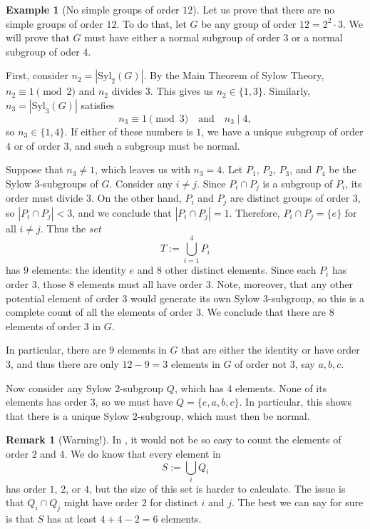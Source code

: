 \documentclass[12pt]{report}
\numberwithin{equation}{section}
\numberwithin{theorem}{chapter}
\theoremstyle{definition}
\newtheorem{example}[theorem]{Example}
\newtheorem*{basic properties}{Basic Properties}
\newtheorem*{Important Remark}{Important Remark}
\newtheorem{remark}[theorem]{Remark}
\begin{document}
\begin{example}[No simple groups of order $12$]\label{example sylow 12}
Let us prove that there are no simple groups of order $12$. To do that, let $G$ be any group of order $12 = 2^2 \cdot 3$. We will prove that $G$ must have either a normal subgroup of order $3$ or a normal subgroup of oder $4$.


First, consider $n_2=|\mathrm{Syl}_2(G)|$. By the Main Theorem of Sylow Theory, $n_2 \equiv 1 \!\pmod 2$ and $n_2$ divides $3$. This gives us $n_2 \in \{ 1, 3 \}$. Similarly, $n_3 = |\mathrm{Syl}_3(G)|$ satisfies
$$n_3 \equiv 1 \!\!\pmod 3 \quad \textrm{and} \quad n_3 \mid 4,$$
so $n_3 \in \{1, 4 \}$.
If either of these numbers is $1$, we have a unique subgroup of order $4$ or of order $3$, and such a subgroup must be normal. 

Suppose that $n_3 \neq 1$, which leaves us with $n_3 = 4$. Let $P_1$, $P_2$, $P_3$, and $P_4$ be the Sylow $3$-subgroups of $G$. Consider any $i \neq j$. Since $P_i \cap P_j$ is a subgroup of $P_i$, its order must divide $3$. On the other hand, $P_i$ and $P_j$ are distinct groups of order $3$, so $|P_i \cap P_j| < 3$, and we conclude that  $|P_i \cap P_j| = 1$. Therefore, $P_i \cap P_j = \{e\}$ for all $i \neq j$. Thus the {\em set} 
$$T := \bigcup_{i=1}^4 P_i$$ 
has $9$ elements: the identity $e$ and $8$ other distinct elements. Since each $P_i$ has order $3$, those $8$ elements must all have order $3$. Note, moreover, that any other potential element of order $3$ would generate its own Sylow $3$-subgroup, so this is a complete count of all the elements of order $3$. We conclude that there are $8$ elements of order $3$ in $G$.

In particular, there are $9$ elements in $G$ that are either the identity or have order $3$, and thus there are only $12-9=3$ elements in $G$ of order not $3$, say $a, b, c$.

Now consider any Sylow $2$-subgroup $Q$, which has $4$ elements. None of its elements has order $3$, so we must have $Q = \{ e, a, b, c \}$. In particular, this shows that there is a unique Sylow $2$-subgroup, which must then be normal.
\end{example}


\begin{remark}[Warning!]
In , it would not be so easy to count the elements of order $2$ and $4$. We do know that every element in 
$$S := \bigcup_i Q_i$$ 
has order $1$, $2$, or $4$, but the size of this set is harder to calculate. The issue is that $Q_i \cap Q_j$ might have order $2$ for distinct $i$ and $j$. The best we can say for sure is that $S$ has at least $4 + 4 - 2 = 6$ elements.
\end{remark}
\end{document}
